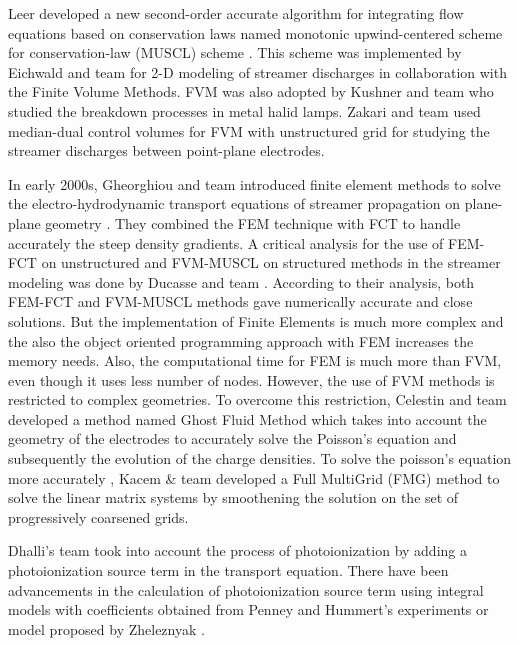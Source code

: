 Leer developed a new second-order accurate algorithm for integrating flow equations based on conservation laws named monotonic upwind-centered scheme for conservation-law (MUSCL) scheme \cite{Brahm Van Leer, 1979}. This scheme was implemented by Eichwald and team \cite{Eichwald et al, 1998, 2006} for 2-D modeling of streamer discharges in collaboration with the Finite Volume Methods. FVM was also adopted by Kushner and team \cite{Kushner et al 2003} who studied the breakdown processes in metal halid lamps. Zakari and team \cite{Zakari et al 2015} used median-dual control volumes for FVM with unstructured grid for studying the streamer discharges between point-plane electrodes.

In early 2000s, Gheorghiou and team introduced finite element methods to solve the electro-hydrodynamic transport equations of streamer propagation on plane-plane geometry \cite{Gheorghiou et al, 1999}. They combined the FEM technique with FCT to handle accurately the steep density gradients. A critical analysis for the use of FEM-FCT on unstructured and FVM-MUSCL on structured methods in the streamer modeling was done by Ducasse and team \cite{Ducasse et al 2007}. According to their analysis, both FEM-FCT and FVM-MUSCL methods gave numerically accurate and close solutions. But the implementation of Finite Elements is much more complex and the also the object oriented programming approach with FEM increases the memory needs. Also, the computational time for FEM is much more than FVM, even though it uses less number of nodes. However, the use of FVM methods is restricted to complex geometries. To overcome this restriction, Celestin and team \cite{Celestin et al, 2009} developed a method named Ghost Fluid Method which takes into account the geometry of the electrodes to accurately solve the Poisson's equation and subsequently the evolution of the charge densities. To solve the poisson's equation more accurately , Kacem & team \cite{Kacem et al 2011} developed a Full MultiGrid (FMG) method to solve the linear matrix systems by smoothening the solution on the set of progressively coarsened grids.

Dhalli's team \cite{Dhalli & Williams, 1987} took into account the process of photoionization by adding a photoionization source term in the transport equation. There have been advancements in the calculation of photoionization source term using integral models with coefficients obtained from Penney and Hummert's experiments \cite{Penney et al , 1970} or model proposed by Zheleznyak \cite{Zheleznyak, 1982}.  

